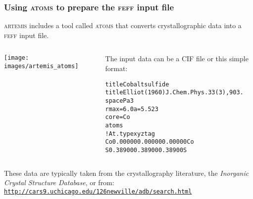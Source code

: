 \documentclass[10pt, xcolor=x11names, compress]{beamer}
\begin{document}
\begin{frame}[fragile]
  \frametitle{Using \textsc{atoms} to prepare the \textsc{feff} input file}
  \textsc{artemis} includes a tool called \textsc{atoms} that converts
  crystallographic data into a \textsc{feff} input file.

  \medskip

  \begin{columns}[c]
    \begin{column}[c]{0.5\linewidth}
      \begin{center}
        \texttt{[image: images/artemis\_atoms]}
      \end{center}
    \end{column}
    \begin{column}[c]{0.5\linewidth}
      The input data can be a CIF file or this simple format:
      \begin{block}{}
        \begin{alltt}
          \tiny
 {\color{Green4}title Cobalt sulfide}
 {\color{Green4}title Elliot (1960) J.Chem. Phys. 33(3), 903.}
 {\color{Brown4}space} P a 3
 {\color{Brown4}rmax}=6.0   {\color{Brown4}a}=5.523
 {\color{Brown4}core}=Co
 {\color{Brown4}atoms}
 {\color{Blue4}! At.type   x     y     z      tag}
    Co     0.00000   0.00000   0.00000  Co
    S      0.38900   0.38900   0.38900  S
         \end{alltt}
       \end{block}
     \end{column}
   \end{columns}

   \bigskip

   These data are typically taken from the crystallography literature,
   the \textit{Inorganic Crystal Structure Database}, or from:
   \href{http://cars9.uchicago.edu/\char126newville/adb/search.html}
   {\color{Blue4}\texttt{http://cars9.uchicago.edu/\char126newville/adb/search.html}}
\end{frame}
\end{document}
